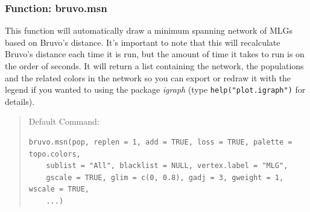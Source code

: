 \documentclass[letterpaper]{article}\usepackage[]{graphicx}\usepackage[]{color}
\makeatletter
\newenvironment{kframe}{%
 \def\at@end@of@kframe{}%
 \ifinner\ifhmode%
  \def\at@end@of@kframe{\end{minipage}}%
  \begin{minipage}{\columnwidth}%
 \fi\fi%
 \def\FrameCommand##1{\hskip\@totalleftmargin \hskip-\fboxsep
 \colorbox{shadecolor}{##1}\hskip-\fboxsep
     \hskip-\linewidth \hskip-\@totalleftmargin \hskip\columnwidth}%
 \MakeFramed {\advance\hsize-\width
   \@totalleftmargin\z@ \linewidth\hsize
   \@setminipage}}%
 {\par\unskip\endMakeFramed%
 \at@end@of@kframe}
\newenvironment{knitrout}{}{} %
\newcommand{\tab}{\hspace*{1em}}
\makeatother
\begin{document}
\subsubsection{Function: bruvo.msn}\label{index:trees:bruvo.msn}
\tab\tab This function will automatically draw a minimum spanning network of MLGs based on Bruvo's distance. It's important to note that this will recalculate Bruvo's distance each time it is run, but the amount of time it takes to run is on the order of seconds. It will return a list containing the network, the populations and the related colors in the network so you can export or redraw it with the legend if you wanted to using the package \textit{igraph} (type \texttt{help("plot.igraph")} for details).
\begin{quote}
Default Command:
\begin{knitrout}
\color{fgcolor}\begin{kframe}
\begin{verbatim}
bruvo.msn(pop, replen = 1, add = TRUE, loss = TRUE, palette = topo.colors, 
    sublist = "All", blacklist = NULL, vertex.label = "MLG", 
    gscale = TRUE, glim = c(0, 0.8), gadj = 3, gweight = 1, wscale = TRUE, 
    ...)
\end{verbatim}
\end{kframe}
\end{knitrout}

\end{quote}
\end{document}
